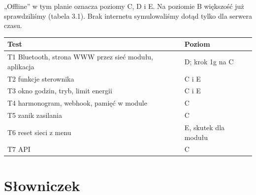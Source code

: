 \documentclass[11pt,a4paper]{article}
\begin{document}
„Offline” w tym planie oznacza poziomy C, D i E. Na poziomie B większość już sprawdziliśmy (tabela 3.1). Brak internetu symulowaliśmy dotąd tylko dla serwera czasu.


\begin{longtable}{>{\raggedright\arraybackslash}p{12.35cm}>{\raggedright\arraybackslash}p{3.37cm}}
\toprule
\rowcolor{apteallight}\textbf{Test} & \textbf{Poziom} \\
\midrule\endhead
\bottomrule\endfoot
T1 Bluetooth, strona WWW przez sieć modułu, aplikacja & D; krok 1g na C \\
T2 funkcje sterownika & C i E \\
T3 okno godzin, tryb, limit energii & C i E \\
T4 harmonogram, webhook, pamięć w module & C \\
T5 zanik zasilania & C \\
T6 reset sieci z menu & E, skutek dla modułu \\
T7 API & C \\
\end{longtable}

\section*{Słowniczek}
\end{document}
